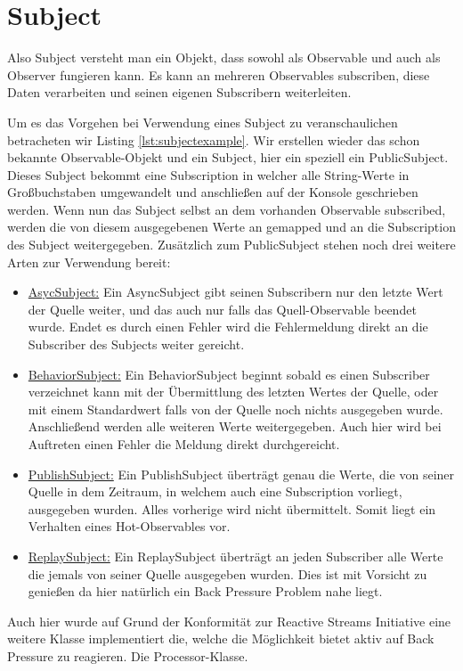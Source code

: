 \section{Subject}
Also Subject versteht man ein Objekt, dass sowohl als Observable und auch als Observer fungieren kann. Es kann an mehreren Observables subscriben, diese Daten verarbeiten und seinen eigenen Subscribern weiterleiten. 

Um es das Vorgehen bei Verwendung eines Subject zu veranschaulichen betracheten wir Listing \ref{lst:subjectexample}. Wir erstellen wieder das schon bekannte Observable-Objekt und ein Subject, hier ein speziell ein PublicSubject. Dieses Subject bekommt eine Subscription in welcher alle String-Werte in Großbuchstaben umgewandelt und anschließen auf der Konsole geschrieben werden. Wenn nun das Subject selbst an dem vorhanden Observable subscribed, werden die von diesem ausgegebenen Werte an gemapped und an die Subscription des Subject weitergegeben. Zusätzlich zum PublicSubject stehen noch drei weitere Arten zur Verwendung bereit:
\begin{itemize}
	\item \underline{AsycSubject:} Ein AsyncSubject gibt seinen Subscribern nur den letzte Wert der Quelle weiter, und das auch nur falls das Quell-Observable beendet wurde. Endet es durch einen Fehler wird die Fehlermeldung direkt an die Subscriber des Subjects weiter gereicht.
	\item \underline{BehaviorSubject:} Ein BehaviorSubject beginnt sobald es einen Subscriber verzeichnet kann mit der Übermittlung des letzten Wertes der Quelle, oder mit einem Standardwert falls von der Quelle noch nichts ausgegeben wurde. Anschließend werden alle weiteren Werte weitergegeben. Auch hier wird bei Auftreten einen Fehler die Meldung direkt durchgereicht.
	\item \underline{PublishSubject:} Ein PublishSubject überträgt genau die Werte, die von seiner Quelle in dem Zeitraum, in welchem auch eine Subscription vorliegt, ausgegeben wurden. Alles vorherige wird nicht übermittelt. Somit liegt ein Verhalten eines Hot-Observables vor.
	\item \underline{ReplaySubject:} Ein ReplaySubject überträgt an jeden Subscriber alle Werte die jemals von seiner Quelle ausgegeben wurden. Dies ist mit Vorsicht zu genießen da hier natürlich ein Back Pressure Problem nahe liegt. 
\end{itemize}
Auch hier wurde auf Grund der Konformität zur Reactive Streams Initiative eine weitere Klasse implementiert die, welche die Möglichkeit bietet aktiv auf Back Pressure zu reagieren. Die Processor-Klasse.
